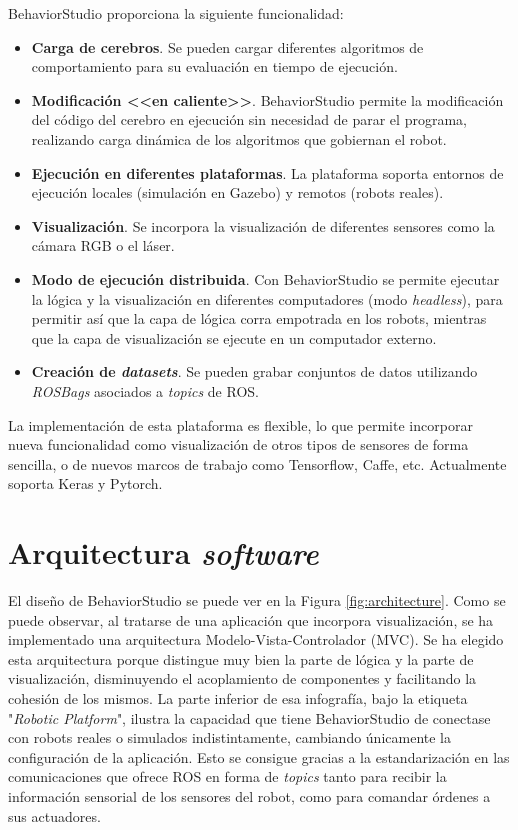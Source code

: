 \noindent BehaviorStudio proporciona la siguiente funcionalidad:

\begin{itemize}
    \item \textbf{Carga de cerebros}. Se pueden cargar diferentes algoritmos de comportamiento para su evaluación en tiempo de ejecución.
    \item \textbf{Modificación <<en caliente>>}. BehaviorStudio permite la modificación del código del cerebro en ejecución sin necesidad de parar el programa, realizando carga dinámica de los algoritmos que gobiernan el robot.
    \item \textbf{Ejecución en diferentes plataformas}. La plataforma soporta entornos de ejecución locales (simulación en Gazebo) y remotos (robots reales).
    \item \textbf{Visualización}. Se incorpora la visualización de diferentes sensores como la cámara RGB o el láser.
    \item \textbf{Modo de ejecución distribuida}. Con BehaviorStudio se permite ejecutar la lógica y la visualización en diferentes computadores (modo \textit{headless}), para permitir así que la capa de lógica corra empotrada en los robots, mientras que la capa de visualización se ejecute en un computador externo.
    \item \textbf{Creación de \textit{datasets}}. Se pueden grabar conjuntos de datos utilizando \textit{ROSBags} asociados a \textit{topics} de ROS.
\end{itemize}

La implementación de esta plataforma es flexible, lo que permite incorporar nueva funcionalidad como visualización de otros tipos de sensores de forma sencilla, o de nuevos marcos de trabajo como Tensorflow, Caffe, etc. Actualmente soporta Keras y Pytorch.

\section{Arquitectura \textit{software}}

El diseño de BehaviorStudio se puede ver en la Figura \ref{fig:architecture}. Como se puede observar, al tratarse de una aplicación que incorpora visualización, se ha implementado una arquitectura Modelo-Vista-Controlador (MVC). Se ha elegido esta arquitectura porque distingue muy bien la parte de lógica y la parte de visualización, disminuyendo el acoplamiento de componentes y facilitando la cohesión de los mismos. La parte inferior de esa infografía, bajo la etiqueta "\textit{Robotic Platform}", ilustra la capacidad que tiene BehaviorStudio de conectase con robots reales o simulados indistintamente, cambiando únicamente la configuración de la aplicación. Esto se consigue gracias a la estandarización en las comunicaciones que ofrece ROS en forma de \textit{topics} tanto para recibir la información sensorial de los sensores del robot, como para comandar órdenes a sus actuadores.

